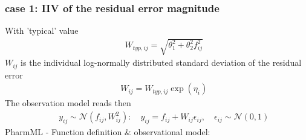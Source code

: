 \documentclass[a4paper,10pt]{article}
\begin{document}
\subsubsection{case 1: IIV of the residual error magnitude}
With 'typical' value
\begin{eqnarray}
&& W_{typ,ij} = \sqrt{\theta_1^2 + \theta_2^2 f_{ij}^2} \nonumber
\end{eqnarray}
$W_{ij}$ is the individual log-normally distributed standard deviation of the residual error
\begin{eqnarray}
&& W_{ij} = W_{typ,ij} \exp(\eta_i) \nonumber
\end{eqnarray}
The observation model reads then
\begin{eqnarray}
&& y_{ij} \sim \mathcal{N}(f_{ij},W_{ij}^2): \quad y_{ij} = f_{ij} + W_{ij} \epsilon_{ij}, \quad \epsilon_{ij} \sim \mathcal{N}(0,1)	 \nonumber
\end{eqnarray}
PharmML - Function definition \& observational model:
\end{document}
